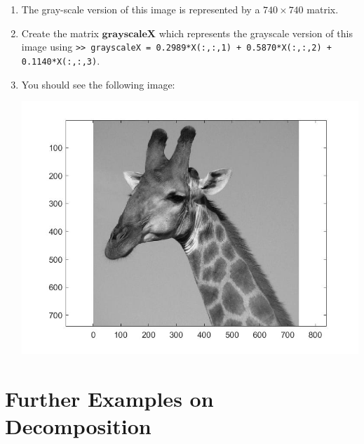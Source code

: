 \begin{sol}
\begin{enumerate}
\begin{center}
            \end{center}
        \item The gray-scale version of this image is represented by a $740\times740$ matrix.
        \item Create the matrix $\mathbf{grayscaleX}$ which represents the grayscale version of this image using \texttt{>> grayscaleX = 0.2989*X(:,:,1) + 0.5870*X(:,:,2) + 0.1140*X(:,:,3)}.
        \item You should see the following image:
                \begin{center} \includegraphics[scale=.4]{FacesNight1/figs/graygiraffe.jpg}
                \label{fig:graygiraffe}
                \end{center}
    \end{enumerate}
    \end{sol}

\section{Further Examples on Decomposition}


